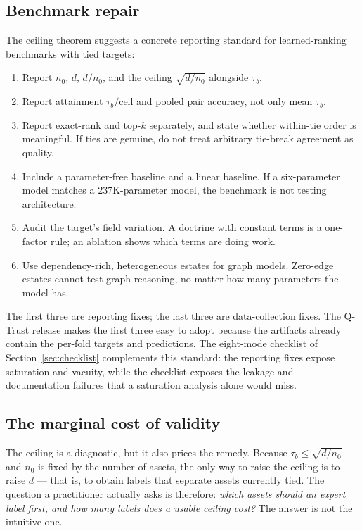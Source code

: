 \documentclass[conference,10pt]{IEEEtran}
\newcommand{\tb}{\tau_b}
\newcommand{\ceil}{\mathrm{ceil}}
\newcommand{\distinct}{d}
\newcommand{\nzero}{n_0}
\begin{document}
\subsection{Benchmark repair}
The ceiling theorem suggests a concrete reporting standard for learned-ranking benchmarks with
tied targets:
\begin{enumerate}
\item Report $\nzero$, $\distinct$, $\distinct/\nzero$, and the ceiling
$\sqrt{\distinct/\nzero}$ alongside $\tb$.
\item Report attainment $\tb/\ceil$ and pooled pair accuracy, not only mean $\tb$.
\item Report exact-rank and top-$k$ separately, and state whether within-tie order is
meaningful. If ties are genuine, do not treat arbitrary tie-break agreement as quality.
\item Include a parameter-free baseline and a linear baseline. If a six-parameter model matches a
237K-parameter model, the benchmark is not testing architecture.
\item Audit the target's field variation. A doctrine with constant terms is a one-factor rule;
an ablation shows which terms are doing work.
\item Use dependency-rich, heterogeneous estates for graph models. Zero-edge estates cannot test
graph reasoning, no matter how many parameters the model has.
\end{enumerate}
The first three are reporting fixes; the last three are data-collection fixes. The Q-Trust release
makes the first three easy to adopt because the artifacts already contain the per-fold targets
and predictions. The eight-mode checklist of Section~\ref{sec:checklist} complements this
standard: the reporting fixes expose saturation and vacuity, while the checklist exposes the
leakage and documentation failures that a saturation analysis alone would miss.

\subsection{The marginal cost of validity}
\label{sec:marginal}

The ceiling is a diagnostic, but it also prices the remedy. Because $\tb \le
\sqrt{\distinct/\nzero}$ and $\nzero$ is fixed by the number of assets, the only way to raise the
ceiling is to raise $\distinct$ --- that is, to obtain labels that separate assets currently
tied. The question a practitioner actually asks is therefore: \emph{which assets should an expert
label first, and how many labels does a usable ceiling cost?} The answer is not the intuitive one.
\end{document}
